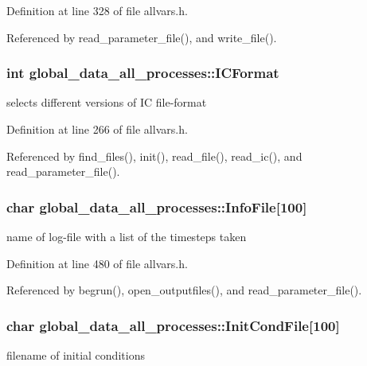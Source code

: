 Definition at line 328 of file allvars.h.



Referenced by read\_\-parameter\_\-file(), and write\_\-file().

\hypertarget{structglobal__data__all__processes_a1c63650e75378a527870ab40f1145df1}{
\subsubsection[{ICFormat}]{\setlength{\rightskip}{0pt plus 5cm}int {\bf global\_\-data\_\-all\_\-processes::ICFormat}}}
\label{structglobal__data__all__processes_a1c63650e75378a527870ab40f1145df1}
selects different versions of IC file-\/format 

Definition at line 266 of file allvars.h.



Referenced by find\_\-files(), init(), read\_\-file(), read\_\-ic(), and read\_\-parameter\_\-file().

\hypertarget{structglobal__data__all__processes_a3cbcdacb8b522288268993f0ce5b15ac}{
\subsubsection[{InfoFile}]{\setlength{\rightskip}{0pt plus 5cm}char {\bf global\_\-data\_\-all\_\-processes::InfoFile}\mbox{[}100\mbox{]}}}
\label{structglobal__data__all__processes_a3cbcdacb8b522288268993f0ce5b15ac}
name of log-\/file with a list of the timesteps taken 

Definition at line 480 of file allvars.h.



Referenced by begrun(), open\_\-outputfiles(), and read\_\-parameter\_\-file().

\hypertarget{structglobal__data__all__processes_adacd2b54a924bb4ce144afc1abbc6138}{
\subsubsection[{InitCondFile}]{\setlength{\rightskip}{0pt plus 5cm}char {\bf global\_\-data\_\-all\_\-processes::InitCondFile}\mbox{[}100\mbox{]}}}
\label{structglobal__data__all__processes_adacd2b54a924bb4ce144afc1abbc6138}
filename of initial conditions 

